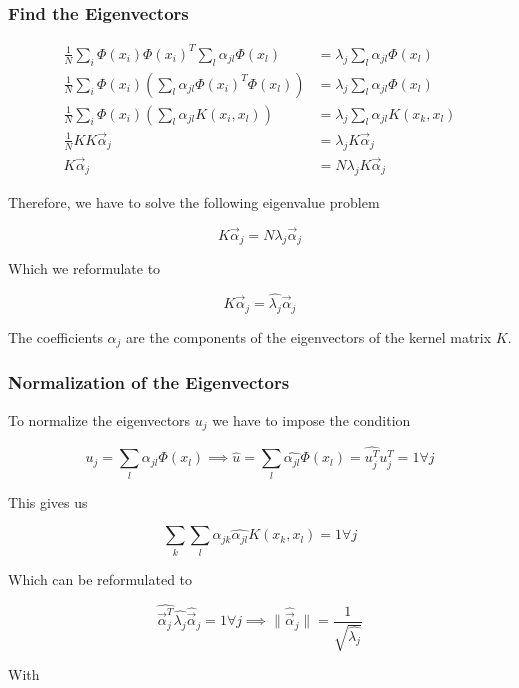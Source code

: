 \subsubsection{Find the Eigenvectors}

\begin{align*}
    \frac{1}{N} \sum_{i} \Phi(x_i) \Phi(x_i)^T \sum_{l} \alpha_{jl} \Phi(x_l) &= \lambda_j \sum_{l} \alpha_{jl} \Phi(x_l) \\
    \frac{1}{N} \sum_{i} \Phi(x_i) \left( \sum_{l} \alpha_{jl} \Phi(x_i)^T \Phi(x_l) \right) &= \lambda_j \sum_{l} \alpha_{jl} \Phi(x_l) \\
    \frac{1}{N} \sum_{i} \Phi(x_i) \left( \sum_{l} \alpha_{jl} K(x_i, x_l) \right) &= \lambda_j \sum_{l} \alpha_{jl} K(x_k, x_l) \\
    \frac{1}{N} KK \vec{\alpha}_j &= \lambda_j K \vec{\alpha}_j \\
     K \vec{\alpha}_j &= N \lambda_j K \vec{\alpha}_j
\end{align*}

Therefore, we have to solve the following eigenvalue problem

\[
    K \vec{\alpha}_j = N \lambda_j \vec{\alpha}_j
\]

Which we reformulate to 

\[
    K \vec{\alpha}_j = \hat{\lambda_j}\vec{\alpha}_j
\]

The coefficients \(\alpha_j\) are the components of the eigenvectors of the kernel matrix \(K\). 

\subsubsection{Normalization of the Eigenvectors}

To normalize the eigenvectors \(u_j\) we have to impose the condition 

\[
    u_j = \sum_{l} \alpha_{jl} \Phi(x_l) \implies \hat{u} = \sum_{l} \hat{\alpha_{jl}} \Phi(x_l) = \hat{u_j^T} u_j^T = 1 \forall j
\]

This gives us

\[
    \sum_k \sum_l \hat{\alpha_{jk}} \hat{\alpha_{jl}} K(x_k, x_l) = 1 \forall j
\]

Which can be reformulated to

\[
    \hat{\vec{\alpha}_j^T} \hat{\lambda_j} \hat{\vec{\alpha}}_j = 1 \forall j \implies \|\hat{\vec{\alpha}}_j\| = \frac{1}{\sqrt{\hat{\lambda_j}}}
\]

With 

